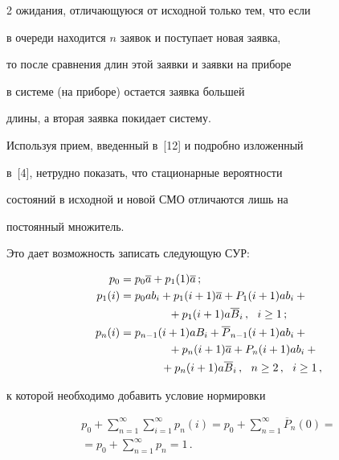 \begin{multicols}{2}
ожидания, отличающуюся от исходной только тем, что если


в очереди находится $n$ заявок и поступает новая заявка,


то после сравнения длин этой заявки и заявки на приборе


в системе (на приборе) остается заявка большей


длины, а вторая заявка покидает систему.


Используя прием, введенный в~[12] и подробно изложенный


в~[4], нетрудно показать, что стационарные вероятности


состояний в исходной и новой СМО отличаются лишь на


постоянный множитель.


Это дает возможность записать следующую СУР:


\begin{align}


p_{0} &= p_{0} \a + p_{1}(1) \a\,; \label{e1p}\\


p_{1}(i) & = p_{0} a b_i + p_{1}(i+1) \a + P_{1}(i+1) a b_i +{}\notag\\


&\ \ \ \ \ \ \ \ \ \ \ \ \ {}+ p_{1}(i+1) a \overline B_i\,, \ \ i\ge 1\,; \label{e2p} \\


p_{n}(i) & = p_{n-1}(i+1) a B_i + \overline P_{n-1}(i+1) a b_i +{}\notag\\


&\ \ \ \ \ \ \ \ \ \ \ \ \ {}+ p_{n}(i+1) \a + P_{n}(i+1) a b_i +{}\notag\\


&\ \ \ \ \ \ \ \ \ \ \ {}+ p_{n}(i+1) a \overline B_i\,,


\ \ n\ge 2\,,\ \ i\ge 1\,, \label{e3p}


\end{align}


к которой необходимо добавить условие норми\-ровки


\begin{multline}


p_0 + \sum\limits_{n=1}^\infty \sum\limits_{i=1}^\infty


p_n(i) = p_0 + \sum\limits_{n=1}^\infty \overline P_{n}(0) ={}\\


{}=p_0 + \sum\limits_{n=1}^\infty p_{n} = 1\,. \label{e4p}


\end{multline}






\end{multicols}
